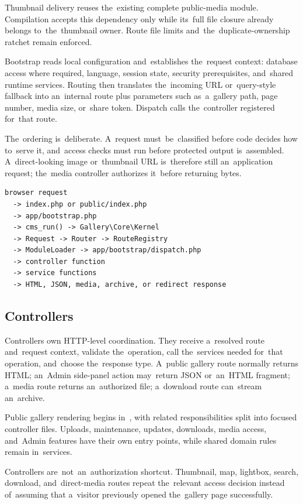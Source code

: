 \documentclass[11pt,a4paper]{article}
\newcommand{\filepath}[1]{\path{#1}}
\begin{document}
Thumbnail delivery reuses the~existing complete public-media module.
Compilation accepts this dependency only while its~full file closure already
belongs to~the~thumbnail owner. Route file limits and~the~duplicate-ownership
ratchet remain enforced.

Bootstrap reads local configuration and~establishes the~request context:
database access where required, language, session state, security prerequisites,
and~shared runtime services. Routing then translates the~incoming URL
or~query-style fallback into an~internal route plus parameters such as~a~gallery
path, page number, media size, or~share token. Dispatch calls the~controller
registered for~that route.

The~ordering is~deliberate. A~request must~be~classified before code decides how
to~serve it, and~access checks must run before protected output is~assembled.
A~direct-looking image or~thumbnail URL is~therefore still an~application
request; the~media controller authorizes it~before returning bytes.

\begin{lstlisting}
browser request
  -> index.php or public/index.php
  -> app/bootstrap.php
  -> cms_run() -> Gallery\Core\Kernel
  -> Request -> Router -> RouteRegistry
  -> ModuleLoader -> app/bootstrap/dispatch.php
  -> controller function
  -> service functions
  -> HTML, JSON, media, archive, or redirect response
\end{lstlisting}

\subsection{Controllers}

Controllers own HTTP-level coordination. They receive a~resolved route
and~request context, validate the~operation, call the~services needed for~that
operation, and~choose the~response type. A~public gallery route normally returns
HTML; an~Admin side-panel action may~return JSON or~an~HTML fragment; a~media
route returns an~authorized file; a~download route can~stream an~archive.

Public gallery rendering begins
in~\filepath{app/controllers/public_gallery.php}, with related responsibilities
split into focused controller files. Uploads, maintenance, updates, downloads,
media access, and~Admin features have their own entry points, while shared
domain rules remain in~services.

Controllers are~not~an~authorization shortcut. Thumbnail, map, lightbox, search,
download, and~direct-media routes repeat the~relevant access decision instead
of~assuming that a~visitor previously opened the~gallery page successfully.
\end{document}
